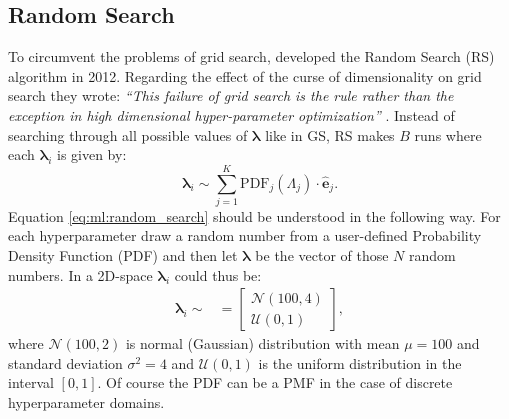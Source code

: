 \documentclass[a4paper, twoside, nobib]{tufte-book}
\begin{document}
\subsection{Random Search}
\label{subsec:ml:random_search}

To circumvent the problems of grid search, \citet{bergstraRandomSearchHyperparameter2012} developed the Random Search (RS) algorithm in 2012. Regarding the effect of the curse of dimensionality on grid search they wrote: \emph{``This failure of grid search is the rule rather than the exception in high dimensional hyper-parameter optimization''} \citep{bergstraRandomSearchHyperparameter2012}. Instead of searching through all possible values of $\bm{\lambda}$ like in GS, RS makes $B$ runs where each $\bm{\lambda}_i$ is given by:
\begin{equation}
  \label{eq:ml:random_search}
  \bm{\lambda}_i \sim \sum_{j=1}^K  \mathrm{PDF}_j(\Lambda_j) \cdot \bm{\hat{e}}_j  .
\end{equation}
Equation \eqref{eq:ml:random_search} should be understood in the following way. For each hyperparameter draw a random number from a user-defined Probability Density Function (PDF) and then let $\bm{\lambda}$ be the vector of those $N$ random numbers. In a 2D-space $\bm{\lambda}_i$ could thus be: 
\begin{align}
  \bm{\lambda}_i \sim &= \begin{bmatrix}
      \mathcal{N}(100, 4) \\
      \mathcal{U}(0, 1)
       \end{bmatrix},
\end{align}
where $\mathcal{N}(100, 2)$ is normal (Gaussian) distribution with mean $\mu=100$ and standard deviation $\sigma^2=4$ and $\mathcal{U}(0, 1)$ is the uniform distribution in the interval $[0, 1]$. Of course the PDF can be a PMF in the case of discrete hyperparameter domains.
\end{document}
